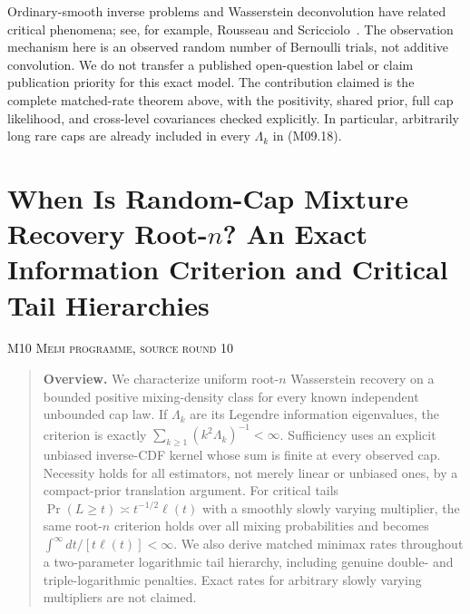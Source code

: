 \documentclass[11pt,a4paper]{article}
\theoremstyle{definition}\newtheorem{definition}[theorem]{Definition}
\theoremstyle{remark}\newtheorem{remark}[theorem]{Remark}
\numberwithin{equation}{section}
\begin{document}
Ordinary-smooth inverse problems and Wasserstein deconvolution have related critical phenomena; see, for example, Rousseau and Scricciolo~\cite{ref025}. The observation mechanism here is an observed random number of Bernoulli trials, not additive convolution. We do not transfer a published open-question label or claim publication priority for this exact model. The contribution claimed is the complete matched-rate theorem above, with the positivity, shared prior, full cap likelihood, and cross-level covariances checked explicitly. In particular, arbitrarily long rare caps are already included in every $\Lambda_k$ in (M09.18).





\clearpage
\section[M10 --- When Is Random-Cap Mixture Recovery Root-\texorpdfstring{$n$}{n}? An Exact Information Criterion and Critical Tail Hierarchies]{When Is Random-Cap Mixture Recovery Root-\texorpdfstring{$n$}{n}? An Exact Information Criterion and Critical Tail Hierarchies}\label{contrib-M10}
\noindent\textsc{M10 \quad Meiji programme, source round 10}\par\medskip


\begin{quote}\small\textbf{Overview.} We characterize uniform root-$n$ Wasserstein recovery on a bounded positive mixing-density class for every known independent unbounded cap law. If $\Lambda_k$ are its Legendre information eigenvalues, the criterion is exactly $\sum_{k\ge1}(k^2\Lambda_k)^{-1}<\infty$. Sufficiency uses an explicit unbiased inverse-CDF kernel whose sum is finite at every observed cap. Necessity holds for all estimators, not merely linear or unbiased ones, by a compact-prior translation argument. For critical tails $\Pr(L\ge t)\asymp t^{-1/2}\ell(t)$ with a smoothly slowly varying multiplier, the same root-$n$ criterion holds over all mixing probabilities and becomes $\int^\infty dt/[t\ell(t)]<\infty$. We also derive matched minimax rates throughout a two-parameter logarithmic tail hierarchy, including genuine double- and triple-logarithmic penalties. Exact rates for arbitrary slowly varying multipliers are not claimed.\end{quote}
\end{document}
